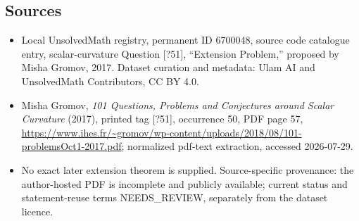 \documentclass[11pt]{article}
\begin{document}
\subsection{Sources}
\begin{itemize}
\item Local UnsolvedMath registry, permanent ID 6700048, source code catalogue entry, scalar-curvature Question [?51], ``Extension Problem,'' proposed by Misha Gromov, 2017. Dataset curation and metadata: Ulam AI and UnsolvedMath Contributors, CC BY 4.0.
\item Misha Gromov, \emph{101 Questions, Problems and Conjectures around Scalar Curvature} (2017), printed tag [?51], occurrence 50, PDF page 57, \url{https://www.ihes.fr/~gromov/wp-content/uploads/2018/08/101-problemsOct1-2017.pdf}; normalized pdf-text extraction, accessed 2026-07-29.
\item No exact later extension theorem is supplied. Source-specific provenance: the author-hosted PDF is incomplete and publicly available; current status and statement-reuse terms NEEDS\_REVIEW, separately from the dataset licence.
\end{itemize}
\end{document}
